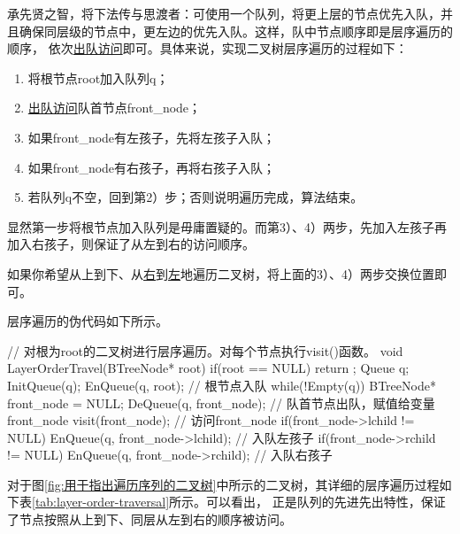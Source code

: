 承先贤之智，将下法传与思渡者：可使用一个队列，将更上层的节点优先入队，并且确保同层级的节点中，更左边的优先入队。这样，队中节点顺序即是层序遍历的顺序，
依次\uline{出队访问}即可。具体来说，实现二叉树层序遍历的过程如下：
\begin{enumerate}[label=\arabic*）]
    \item 将根节点root加入队列q；
    \item \uline{出队访问}队首节点front\_node；
    \item 如果front\_node有左孩子，先将左孩子入队；
    \item 如果front\_node有右孩子，再将右孩子入队；
    \item 若队列q不空，回到第2）步；否则说明遍历完成，算法结束。
\end{enumerate}
显然第一步将根节点加入队列是毋庸置疑的。而第3）、4）两步，先加入左孩子再加入右孩子，则保证了从左到右的访问顺序。
\begin{insightbox}
    如果你希望从上到下、从\uline{右}到\uline{左}地遍历二叉树，将上面的3）、4）两步交换位置即可。
\end{insightbox}
层序遍历的伪代码如下所示。
\begin{cppcode}
// 对根为root的二叉树进行层序遍历。对每个节点执行visit()函数。
    void LayerOrderTravel(BTreeNode* root) {
        if(root == NULL) return ;
        Queue q;
        InitQueue(q);
        EnQueue(q, root);   // 根节点入队
        while(!Empty(q)) {
            BTreeNode* front_node = NULL;
            DeQueue(q, front_node);     // 队首节点出队，赋值给变量front_node
            visit(front_node);          // 访问front_node
            if(front_node->lchild != NULL) {
                EnQueue(q, front_node->lchild);     // 入队左孩子
            }
            if(front_node->rchild != NULL) {
                EnQueue(q, front_node->rchild);     // 入队右孩子
            }
        }
    }
\end{cppcode}
对于图\ref{fig:用于指出遍历序列的二叉树}中所示的二叉树，其详细的层序遍历过程如下表\ref{tab:layer-order-traversal}所示。可以看出，
正是队列的先进先出特性，保证了节点按照从上到下、同层从左到右的顺序被访问。
